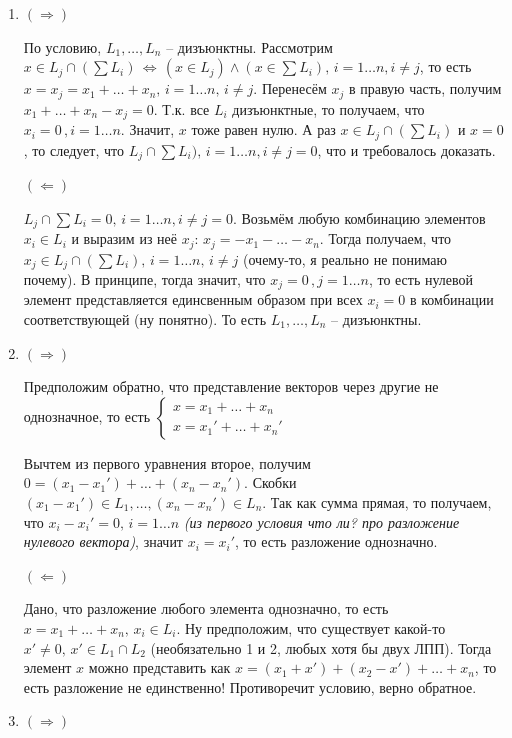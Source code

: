 \documentclass{article}
\begin{document}
\begin{enumerate}
    \item $(\Rightarrow)$
    
    По условию, $L_1,\ldots,L_n$ -- дизъюнктны. Рассмотрим $x\in L_j\cap (\sum L_i)\,\Leftrightarrow\,(x\in L_j)\land (x\in \sum L_i),\,i=1\ldots n,i\neq j$, то есть $x=x_j=x_1+\ldots+x_n,\,i=1\ldots n,\,i\neq j$. Перенесём $x_j$ в правую часть, получим $x_1+\ldots+x_n-x_j=0$. Т.к. все $L_i$ дизъюнктные, то получаем, что $x_i=0\,,i=1\ldots n$. Значит, $x$ тоже равен нулю. А раз $x\in L_j\cap (\sum L_i)$ и $x=0$, то следует, что $L_j\cap \sum L_i),\,i=1\ldots n,i\neq j=0$, что и требовалось доказать.
    
    $(\Leftarrow)$
    
    $L_j\cap \sum L_i=0,\,i=1\ldots n,i\neq j=0$. Возьмём любую комбинацию элементов $x_i\in L_i$ и выразим из неё $x_j$: $x_j=-x_1-\ldots-x_n$. Тогда получаем, что $x_j\in L_j\cap (\sum L_i),\,i=1\ldots n,\,i\neq j$ (очему-то, я реально не понимаю почему). В принципе, тогда значит, что $x_j=0\,,j=1\ldots n$, то есть нулевой элемент представляется единсвенным образом при всех $x_i=0$ в комбинации соответствующей (ну понятно). То есть $L_1,\ldots,L_n$ -- дизъюнктны.
    \newpage
    \item $(\Rightarrow)$
    
    Предположим обратно, что представление векторов через другие не однозначное, то есть
    $\begin{cases} x=x_1+\ldots+x_n\\x=x_1'+\ldots+x_n' \end{cases}$
    
    Вычтем из первого уравнения второе, получим $0=(x_1-x_1')+\ldots+(x_n-x_n')$. Скобки $(x_1-x_1')\in L_1,\ldots,(x_n-x_n')\in L_n$. Так как сумма прямая, то получаем, что $x_i-x_i'=0,\,i=1\ldots n$ \textit{(из первого условия что ли? про разложение нулевого вектора)}, значит $x_i=x_i'$, то есть разложение однозначно.
    
    $(\Leftarrow)$
    
    Дано, что разложение любого элемента однозначно, то есть $x=x_1+\ldots+x_n,\,x_i\in L_i$. Ну предположим, что существует какой-то $x'\neq 0,\,x'\in L_1\cap L_2$ (необязательно 1 и 2, любых хотя бы двух ЛПП). Тогда элемент $x$ можно представить как $x=(x_1+x')+(x_2-x')+\ldots+x_n$, то есть разложение не единственно! Противоречит условию, верно обратное.
    
    \item $(\Rightarrow)$
    

\end{enumerate}
\end{document}
